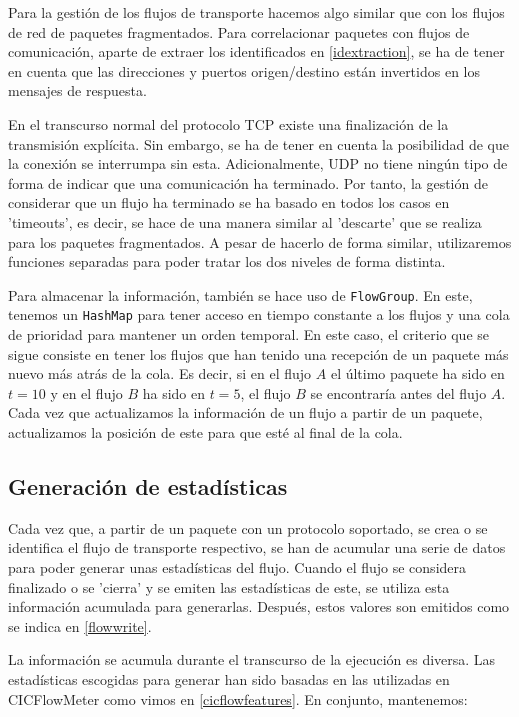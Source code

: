Para la gestión de los flujos de transporte hacemos algo similar que con los flujos de red de paquetes fragmentados. Para correlacionar paquetes con flujos de comunicación, aparte de extraer los identificados en \ref{idextraction}, se ha de tener en cuenta que las direcciones y puertos origen/destino están invertidos en los mensajes de respuesta.

En el transcurso normal del protocolo TCP existe una finalización de la transmisión explícita. Sin embargo, se ha de tener en cuenta la posibilidad de que la conexión se interrumpa sin esta. Adicionalmente, UDP no tiene ningún tipo de forma de indicar que una comunicación ha terminado. Por tanto, la gestión de considerar que un flujo ha terminado se ha basado en todos los casos en 'timeouts', es decir, se hace de una manera similar al 'descarte' que se realiza para los paquetes fragmentados. A pesar de hacerlo de forma similar, utilizaremos funciones separadas para poder tratar los dos niveles de forma distinta.

Para almacenar la información, también se hace uso de \texttt{FlowGroup}. En este, tenemos un \texttt{HashMap} para tener acceso en tiempo constante a los flujos y una cola de prioridad para mantener un orden temporal. En este caso, el criterio que se sigue consiste en tener los flujos que han tenido una recepción de un paquete más nuevo más atrás de la cola. Es decir, si en el flujo $A$ el último paquete ha sido en $t=10$ y en el flujo $B$ ha sido en $t=5$, el flujo $B$ se encontraría antes del flujo $A$. Cada vez que actualizamos la información de un flujo a partir de un paquete, actualizamos la posición de este para que esté al final de la cola.

\subsection{Generación de estadísticas}

Cada vez que, a partir de un paquete con un protocolo soportado, se crea o se identifica el flujo de transporte respectivo, se han de acumular una serie de datos para poder generar unas estadísticas del flujo. Cuando el flujo se considera finalizado o se 'cierra' y se emiten las estadísticas de este, se utiliza esta información acumulada para generarlas. Después, estos valores son emitidos como se indica en \ref{flowwrite}.

La información se acumula durante el transcurso de la ejecución es diversa. Las estadísticas escogidas para generar han sido basadas en las utilizadas en CICFlowMeter como vimos en \ref{cicflowfeatures}. En conjunto, mantenemos:

